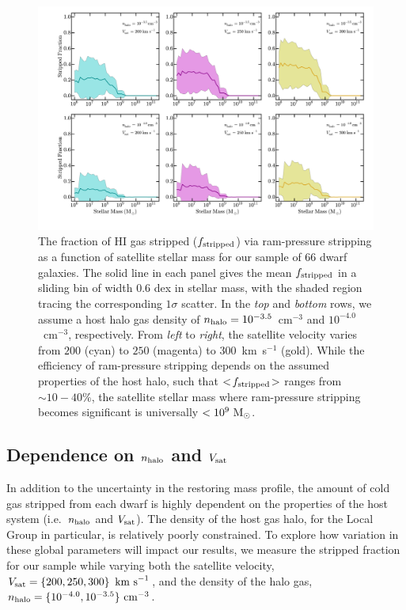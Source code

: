 \begin{figure}
 \centering
 \hspace*{-0.5in}
  \includegraphics[width=6in]{underpressure/f5.pdf}
  \caption[Exploring the efficiency of ram-pressure as host properties vary]{The fraction of H{\scriptsize I} gas stripped ($f_{\rm
      stripped}$) via ram-pressure %
    stripping as a function of satellite stellar mass for our sample
    of $66$ dwarf galaxies. The solid line in each panel gives the
    mean $f_{\rm stripped}$ in a sliding bin of width $0.6$ dex in
    stellar mass, with the shaded region tracing the corresponding
    $1\sigma$ scatter. In the \emph{top} and \emph{bottom} rows, we
    assume a host halo gas density of $n_{\rm
      halo}=10^{-3.5}$~cm$^{-3}$ and $10^{-4.0}$~cm$^{-3}$,
    respectively. From \emph{left} to \emph{right}, the satellite
    velocity varies from $200$ (cyan) to $250$ (magenta) to
    $300$~km~s$^{-1}$ (gold). While the efficiency of ram-pressure
    stripping depends on the assumed properties of the host halo, such
    that $<\!f_{\rm stripped}\!>$ ranges from $\sim10-40\%$, the
    satellite stellar mass where ram-pressure stripping becomes
    significant is universally $<10^{9}~{\rm M}_{\odot}$.}
 \label{fig:MW}
\end{figure}


\subsection{Dependence on \boldmath$n_{\rm halo}$ and
  \boldmath$V_{\rm sat}$}
\label{subsec:drhoV}


In addition to the uncertainty in the restoring mass profile, the
amount of cold gas stripped from each dwarf is highly dependent on the
properties of the host system (i.e.~$n_{\rm halo}$ and $V_{\rm sat}$).
%
The density of the host gas halo, for the Local Group in particular,
is relatively poorly constrained. 
%
To explore how variation in these global parameters will impact our
results, we measure the stripped fraction for our sample while varying
both the satellite velocity, $V_{\rm sat} =\left \{200, 250, 300\right
\}~{\rm km~s}^{-1}$, and the density of the halo gas, $n_{\rm halo} =
\{10^{-4.0}, 10^{-3.5}\}~{\rm cm}^{-3}$.


